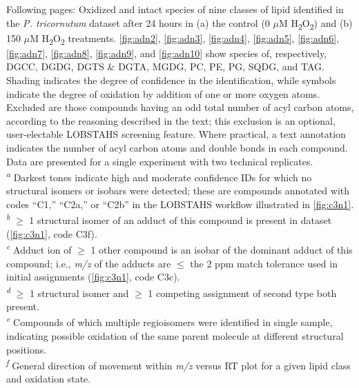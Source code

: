 \begin{footnotesize}
\begin{singlespace}
{\setlength{\parindent}{0pt}
Following pages: Oxidized and intact species of nine classes of lipid identified in the \emph{P. tricornutum} dataset after 24 hours in (a) the control (0 $\mu$M H\textsubscript{2}O\textsubscript{2}) and (b) 150 $\mu$M H\textsubscript{2}O\textsubscript{2} treatments. \autoref{fig:adn2}, \autoref{fig:adn3}, \autoref{fig:adn4}, \autoref{fig:adn5}, \autoref{fig:adn6}, \autoref{fig:adn7}, \autoref{fig:adn8}, \autoref{fig:adn9}, and \autoref{fig:adn10} show species of, respectively, DGCC, DGDG, DGTS \& DGTA, MGDG, PC, PE, PG, SQDG, and TAG. Shading indicates the degree of confidence in the identification, while symbols indicate the degree of oxidation by addition of one or more oxygen atoms. Excluded are those compounds having an odd total number of acyl carbon atoms, according to the reasoning described in the text; this exclusion is an optional, user-electable LOBSTAHS screening feature. Where practical, a text annotation indicates the number of acyl carbon atoms and double bonds in each compound. Data are presented for a single experiment with two technical replicates.\\
\emph{\textsuperscript{a}} Darkest tones indicate high and moderate confidence IDs for which no structural isomers or isobars were detected; these are compounds annotated with codes ``C1,'' ``C2a,'' or ``C2b'' in the LOBSTAHS workflow illustrated in \autoref{fig:c3n1}.\\
\emph{\textsuperscript{b}} $\geq$ 1 structural isomer of an adduct of this compound is present in dataset (\autoref{fig:c3n1}, code C3f).\\
\emph{\textsuperscript{c}} Adduct ion of $\geq$ 1 other compound is an isobar of the dominant adduct of this compound; i.e., \emph{m/z} of the adducts are $\leq$ the 2 ppm match tolerance used in initial assignments (\autoref{fig:c3n1}, code C3c).\\
\emph{\textsuperscript{d}} $\geq$ 1 structural isomer and $\geq$ 1 competing assignment of second type both present.\\
\emph{\textsuperscript{e}} Compounds of which multiple regioisomers were identified in single sample, indicating possible oxidation of the same parent molecule at different structural positions.\\
\emph{\textsuperscript{f}} General direction of movement within \emph{m/z} versus RT plot for a given lipid class and oxidation state.
}
\end{singlespace}
\end{footnotesize}


